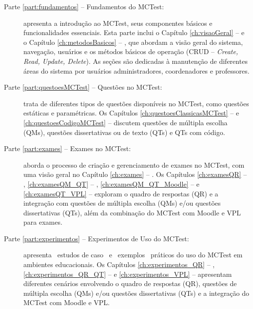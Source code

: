 \begin{description}
    
\item[Parte \ref{part:fundamentos} -- Fundamentos do MCTest:] apresenta a introdução ao MCTest, seus componentes bási\-cos e funcionalidades essenciais. Esta parte inclui o Capítulo \ref{ch:visaoGeral} --  e o Capítulo \ref{ch:metodosBasicos} -- , que abordam a visão geral do sistema, navegação, usuários e os métodos básicos de operação (CRUD -- \textit{Create, Read, Update, Delete}). As seções são dedicadas à manutenção de diferentes áreas do sistema por usuários administradores, coordenadores e professores.

\item[Parte \ref{part:questoesMCTest} -- Questões no MCTest:] trata de diferentes tipos de questões disponíveis no MCTest, como questões estáticas e paramétricas. Os Capítulos \ref{ch:questoesClassicasMCTest}  --  e \ref{ch:questoesCodigoMCTest} --  discutem questões de múltipla escolha (QMs), questões dissertativas ou de texto (QTs) e QTs com código.

\item[Parte \ref{part:exames} -- Exames no MCTest:] aborda o processo de criação e gerenciamento de exames no MCTest, com uma visão geral no Capítulo \ref{ch:exames} -- . Os Capítulos \ref{ch:examesQR}  -- , \ref{ch:examesQM_QT} -- , \ref{ch:examesQM_QT_Moodle} --  e \ref{ch:examesQT_VPL} --  exploram o quadro de respostas (QR) e a integração com questões de múltipla escolha (QMs) e/ou questões dissertativas (QTs), além da combinação do MCTest com Moodle e VPL para exames.

\item[Parte \ref{part:experimentos} -- Experimentos de Uso do MCTest:] apresenta \ estudos de caso \ e \ exemplos \ práticos do uso do MCTest em ambientes educacionais. Os Capítulos \ref{ch:experimentos_QR} -- , \ref{ch:experimentos_QR_QT} --  e \ref{ch:experimentos_VPL} --  apresentam diferentes cenários envolvendo o quadro de respostas (QR), questões de múltipla escolha (QMs) e/ou questões dissertativas (QTs) e a integração do MCTest com Moodle e VPL.



\end{description}
